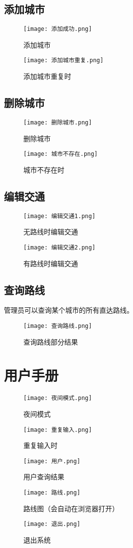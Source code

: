 \documentclass{DateStructure}
\begin{document}
\subsection{添加城市}
\begin{figure}[H] 
\centering
\texttt{[image: 添加成功.png]}
\caption{添加城市}
\end{figure}
\begin{figure}[H] 
\centering
\texttt{[image: 添加城市重复.png]}
\caption{添加城市重复时}
\end{figure}
\subsection{删除城市}
\begin{figure}[H] 
\centering
\texttt{[image: 删除城市.png]}
\caption{删除城市}
\end{figure}
\begin{figure}[H] 
\centering
\texttt{[image: 城市不存在.png]}
\caption{城市不存在时}
\end{figure}
\subsection{编辑交通}
\begin{figure}[H] 
\centering
\texttt{[image: 编辑交通1.png]}
\caption{无路线时编辑交通}
\end{figure}
\begin{figure}[H] 
\centering
\texttt{[image: 编辑交通2.png]}
\caption{有路线时编辑交通}
\end{figure}
\subsection{查询路线}
管理员可以查询某个城市的所有直达路线。
\begin{figure}[H] 
\centering
\texttt{[image: 查询路线.png]}
\caption{查询路线部分结果}
\end{figure}

\section{用户手册}
\begin{figure}[H] 
\centering
\texttt{[image: 夜间模式.png]}
\caption{夜间模式}
\end{figure}
\begin{figure}[H] 
\centering
\texttt{[image: 重复输入.png]}
\caption{重复输入时}
\end{figure}
\begin{figure}[H] 
\centering
\texttt{[image: 用户.png]}
\caption{用户查询结果}
\end{figure}
\begin{figure}[H] 
\centering
\texttt{[image: 路线.png]}
\caption{路线图（会自动在浏览器打开）}
\end{figure}
\begin{figure}[H] 
\centering
\texttt{[image: 退出.png]}
\caption{退出系统}
\end{figure}
\end{document}
